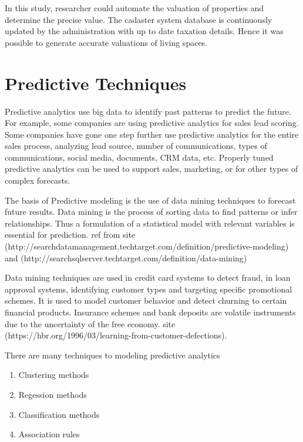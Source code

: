 In this study, researcher could automate the valuation of properties and determine the precise value. The cadaster system database is continuously updated by the administration with up to date taxation details. Hence it was possible to generate accurate valuations of living spaces.

%
%
%
%

\setlength{\footskip}{8mm}

\chapter{Predictive Techniques} 
\label{predictive-techniques}

Predictive analytics use big data to identify past patterns to predict the future. For example, some companies are using predictive analytics for sales lead scoring. Some companies have gone one step further use predictive analytics for the entire sales process, analyzing lead source, number of communications, types of communications, social media, documents, CRM data, etc. Properly tuned predictive analytics can be used to support sales, marketing, or for other types of complex forecasts.


The basis of Predictive modeling is the use of data mining techniques to forecast future results. Data mining is the process of sorting data to find patterns or infer relationships.
Thus a formulation of a statistical model with relevant variables is essential for prediction. 
ref from site (http://searchdatamanagement.techtarget.com/definition/predictive-modeling) and (http://searchsqlserver.techtarget.com/definition/data-mining)

Data mining techniques are used in credit card systems to detect fraud, in loan approval systems, identifying customer types and targeting specific promotional schemes. It is used to model customer behavior and detect churning to certain financial products. Insurance schemes and bank deposits are volatile instruments due to the uncertainty of the free economy. site (https://hbr.org/1996/03/learning-from-customer-defections).


There are many techniques to modeling predictive analytics 


\begin{enumerate}
	\item Clustering methods
	\item Regession methods
	\item Classification methods
	\item Association rules
\end{enumerate}


